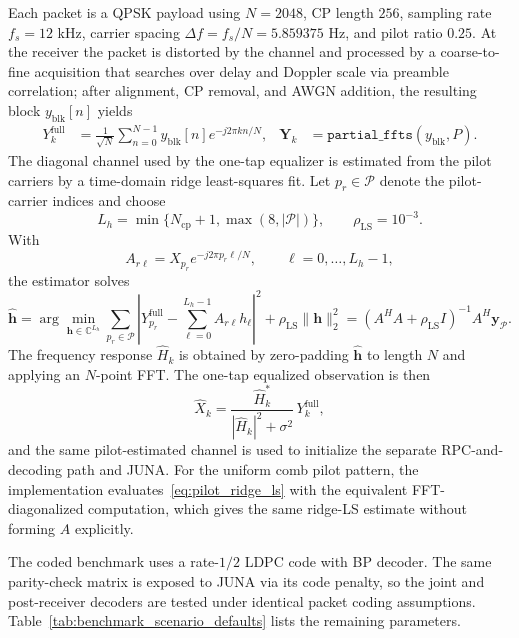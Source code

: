 \documentclass{wileysev}
\begin{document}
	Each packet is a QPSK payload using \(N=2048\), CP length \(256\), sampling rate \(f_s=12\) kHz, carrier spacing \(\Delta f=f_s/N=5.859375\) Hz, and pilot ratio \(0.25\). At the receiver the packet is distorted by the channel and processed by a coarse-to-fine acquisition that searches over delay and Doppler scale via preamble correlation; after alignment, CP removal, and AWGN addition, the resulting block \(y_{\mathrm{blk}}[n]\) yields
	\begin{align}
		Y_k^{\mathrm{full}}
		&=
		\frac{1}{\sqrt{N}}
		\sum_{n=0}^{N-1}
		y_{\mathrm{blk}}[n] e^{-j2\pi kn/N},
		&
		\mathbf{Y}_k
		&=
		\texttt{partial\_ffts}(y_{\mathrm{blk}},P).
		\label{eq:sim_observation_generation}
	\end{align}
	The diagonal channel used by the one-tap equalizer is estimated from the pilot carriers by a time-domain ridge least-squares fit. Let \(p_r\in\mathcal{P}\) denote the pilot-carrier indices and choose
	\[
		L_h=\min\{N_{\mathrm{cp}}+1,\max(8,|\mathcal P|)\},
		\qquad
		\rho_{\mathrm{LS}}=10^{-3}.
	\]
	With
	\[
		A_{r\ell}=X_{p_r}e^{-j2\pi p_r\ell/N},
		\qquad
		\ell=0,\ldots,L_h-1,
	\]
	the estimator solves
	\begin{equation}
		\widehat{\mathbf h}
		=
		\arg\min_{\mathbf h\in\mathbb C^{L_h}}
		\sum_{p_r\in\mathcal P}
		\left|Y_{p_r}^{\mathrm{full}}-\sum_{\ell=0}^{L_h-1}A_{r\ell}h_\ell\right|^2
		+\rho_{\mathrm{LS}}\|\mathbf h\|_2^2
		=
		(A^{H}A+\rho_{\mathrm{LS}}I)^{-1}A^{H}\mathbf y_{\mathcal P}.
		\label{eq:pilot_ridge_ls}
	\end{equation}
	The frequency response \(\widehat H_k\) is obtained by zero-padding \(\widehat{\mathbf h}\) to length \(N\) and applying an \(N\)-point FFT. The one-tap equalized observation is then
	\begin{equation}
		\widehat X_k
		=
		\frac{\widehat H_k^{*}}{|\widehat H_k|^2+\sigma^2}\,
		Y_k^{\mathrm{full}},
		\label{eq:estimated_channel_equalizer}
	\end{equation}
	and the same pilot-estimated channel is used to initialize the separate RPC-and-decoding path and JUNA. For the uniform comb pilot pattern, the implementation evaluates~\eqref{eq:pilot_ridge_ls} with the equivalent FFT-diagonalized computation, which gives the same ridge-LS estimate without forming \(A\) explicitly.
	
	The coded benchmark uses a rate-\(1/2\) LDPC code with BP decoder. The same parity-check matrix is exposed to JUNA via its code penalty, so the joint and post-receiver decoders are tested under identical packet coding assumptions. Table~\ref{tab:benchmark_scenario_defaults} lists the remaining parameters.
	
\end{document}
